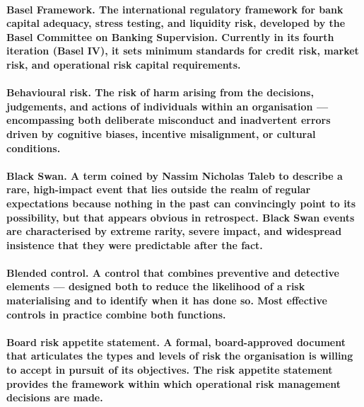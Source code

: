 \paragraph{\textbf{Basel Framework}. The international regulatory framework for bank capital adequacy, stress testing, and liquidity risk, developed by the Basel Committee on Banking Supervision. Currently in its fourth iteration (Basel IV), it sets minimum standards for credit risk, market risk, and operational risk capital requirements.}

\paragraph{\textbf{Behavioural risk}. The risk of harm arising from the decisions, judgements, and actions of individuals within an organisation — encompassing both deliberate misconduct and inadvertent errors driven by cognitive biases, incentive misalignment, or cultural conditions.}

\paragraph{\textbf{Black Swan}. A term coined by Nassim Nicholas Taleb to describe a rare, high-impact event that lies outside the realm of regular expectations because nothing in the past can convincingly point to its possibility, but that appears obvious in retrospect. Black Swan events are characterised by extreme rarity, severe impact, and widespread insistence that they were predictable after the fact.}

\paragraph{\textbf{Blended control}. A control that combines preventive and detective elements — designed both to reduce the likelihood of a risk materialising and to identify when it has done so. Most effective controls in practice combine both functions.}

\paragraph{\textbf{Board risk appetite statement}. A formal, board-approved document that articulates the types and levels of risk the organisation is willing to accept in pursuit of its objectives. The risk appetite statement provides the framework within which operational risk management decisions are made.}

